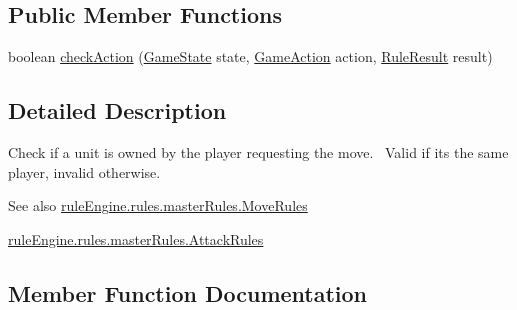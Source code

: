 \subsection*{Public Member Functions}
\begin{DoxyCompactItemize}
\item 
boolean \mbox{\hyperlink{classrule_engine_1_1rules_1_1atomic_rules_1_1_check_is_ally_unit_a961880efbdfdf45e3ad9ecf31dc17cb8}{check\+Action}} (\mbox{\hyperlink{classgame_1_1game_state_1_1_game_state}{Game\+State}} state, \mbox{\hyperlink{classrule_engine_1_1_game_action}{Game\+Action}} action, \mbox{\hyperlink{classrule_engine_1_1_rule_result}{Rule\+Result}} result)
\end{DoxyCompactItemize}


\subsection{Detailed Description}
Check if a unit is owned by the player requesting the move.~\newline
 Valid if it\textquotesingle{}s the same player, invalid otherwise.

\begin{DoxySeeAlso}{See also}
\mbox{\hyperlink{classrule_engine_1_1rules_1_1master_rules_1_1_move_rules}{rule\+Engine.\+rules.\+master\+Rules.\+Move\+Rules}} 

\mbox{\hyperlink{classrule_engine_1_1rules_1_1master_rules_1_1_attack_rules}{rule\+Engine.\+rules.\+master\+Rules.\+Attack\+Rules}} 
\end{DoxySeeAlso}


\subsection{Member Function Documentation}
\mbox{\label{classrule_engine_1_1rules_1_1atomic_rules_1_1_check_is_ally_unit_a961880efbdfdf45e3ad9ecf31dc17cb8}} 
